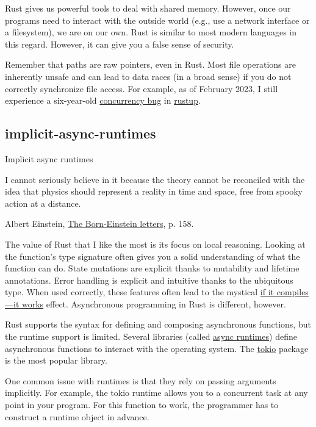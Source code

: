 \documentclass{article}
\begin{document}
Rust gives us powerful tools to deal with shared memory.
However, once our programs need to interact with the outside world (e.g., use a network interface or a filesystem), we are on our own.
Rust is similar to most modern languages in this regard.
However, it can give you a false sense of security.

Remember that paths are raw pointers, even in Rust.
Most file operations are inherently unsafe and can lead to data races (in a broad sense) if you do not correctly synchronize file access.
For example, as of February 2023, I still experience a six-year-old \href{https://github.com/rust-lang/rustup/issues/988}{concurrency bug} in \href{https://rustup.rs/}{rustup}.

\subsection{implicit-async-runtimes}{Implicit async runtimes}
\epigraph{
    I cannot seriously believe in it because the theory cannot be reconciled with the idea that physics should represent a reality in time and space, free from spooky action at a distance.
}{Albert Einstein, \href{https://books.google.ch/books?redir_esc=y&hl=de&id=HvZAAQAAIAAJ&focus=searchwithinvolume&q=spooky+action}{The Born-Einstein letters}, p. 158.}

The value of Rust that I like the most is its focus on local reasoning.
Looking at the function's type signature often gives you a solid understanding of what the function can do.
State mutations are explicit thanks to mutability and lifetime annotations.
Error handling is explicit and intuitive thanks to the ubiquitous  type.
When used correctly, these features often lead to the mystical \href{https://wiki.haskell.org/Why_Haskell_just_works}{if it compiles---it works} effect.
Asynchronous programming in Rust is different, however.

Rust supports the \href{https://rust-lang.github.io/async-book/01_getting_started/04_async_await_primer.html}{} syntax for defining and composing asynchronous functions, but the runtime support is limited.
Several libraries (called \href{https://ncameron.org/blog/what-is-an-async-runtime/}{async runtimes}) define asynchronous functions to interact with the operating system.
The \href{https://crates.io/crates/tokio}{tokio} package is the most popular library.

One common issue with runtimes is that they rely on passing arguments implicitly.
For example, the tokio runtime allows you to \href{https://docs.rs/tokio/latest/tokio/fn.spawn.html}{} a concurrent task at any point in your program.
For this function to work, the programmer has to construct a runtime object in advance.
\end{document}
